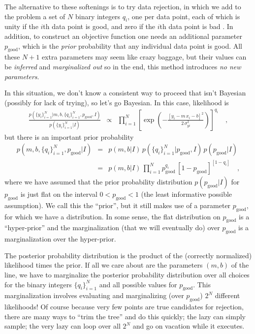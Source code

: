 \documentclass[12pt,twoside]{article}
\newcounter{problem}
\newcommand{\setofall}[3]{\{{#1}\}_{{#2}}^{{#3}}}
\newcommand{\allq}{\setofall{q_i}{i=1}{N}}
\newcommand{\ally}{\setofall{y_i}{i=1}{N}}
\newcommand{\pgood}{p_{\mathrm{good}}}
\begin{document}
The alternative to these softenings is to try data rejection, in which
we add to the problem a set of $N$ binary integers $q_i$, one per data
point, each of which is unity if the $i$th data point is good, and
zero if the $i$th data point is bad \citep{pressH0,jaynes}.  In
addition, to construct an objective function one needs an additional
parameter $\pgood$, which is the \emph{prior} probability that any
individual data point is good.  All these $N+1$ extra parameters may
seem like crazy baggage, but their values can be \emph{inferred} and
\emph{marginalized out} so in the end, this method introduces \emph{no
 new parameters}.

In this situation, we don't know a consistent way to proceed that isn't
Bayesian (possibly for lack of trying), so let's go Bayesian.  In this
case, likelihood is
\begin{eqnarray}\displaystyle
\frac{p(\ally|m,b,\allq,\pgood,I)}{p(\ally|I)}
 &\propto& \prod_{i=1}^N \left[\exp\left(-\frac{[y_i-m\,x_i-b]^2}{2\,\sigma_{yi}^2}\right)\right]^{q_i} \quad ,
\end{eqnarray}
but there is an important prior probability
\begin{eqnarray}\displaystyle
p(m,b,\allq,\pgood|I)
 &=& p(m,b|I)\,p(\allq|\pgood,I)\,p(\pgood|I) \nonumber \\
 &=& p(m,b|I)\,\prod_{i=1}^N\pgood^{q_i}\,[1-\pgood]^{[1-q_i]} \quad ,
\end{eqnarray}
where we have assumed that the prior probability distribution
$p(\pgood|I)$ for $\pgood$ is just flat on the interval $0<\pgood<1$
(the least informative possible assumption).  We call this the
``prior'', but it still makes use of a parameter $\pgood$, for which
we have a distribution.  In some sense, the flat distribution on
$\pgood$ is a ``hyper-prior'' and the marginalization (that we will
eventually do) over $\pgood$ is a marginalization over the
hyper-prior.

The posterior probability distribution is the product of the
(correctly normalized) likelihood times the prior.  If all we care
about are the parameters $(m,b)$ of the line, we have to marginalize
the posterior probability distribution over all choices for the binary
integers $\allq$ and all possible values for $\pgood$.  This
marginalization involves evaluating and marginalizing (over $\pgood$)
$2^N$ different likelihoods!  Of course because very few points are
true candidates for rejection, there are many ways to ``trim the
tree'' and do this quickly; the lazy can simply sample; the very lazy
can loop over all $2^N$ and go on vacation while it executes.
\end{document}
